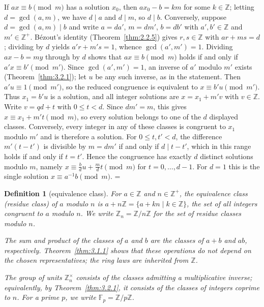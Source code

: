 \documentclass[11pt]{article}
\makeatletter
\theoremstyle{ntstyle}
\newtheorem{definition}{Definition}[subsection]
\let\nt@closedisplay\]
\def\nt@guardedclose{\@ifnextchar\par{\nt@closeafterpar}{\@ifnextchar\end{\postdisplaypenalty\@M\nt@closedisplay}{\nt@closedisplay}}}
\def\nt@closeafterpar\par{\@ifnextchar\par{\nt@closeafterpar}{\@ifnextchar\end{\postdisplaypenalty\@M\nt@closedisplay\par}{\nt@closedisplay\par}}}
\renewenvironment{proof}[1][\proofname]{\par
  \pushQED{\qed}\normalfont\topsep\medskipamount\edef\nt@afterproof{\@endparpenalty=\the\@endparpenalty\relax}\@beginparpenalty\@M\@endparpenalty\@M\let\]\nt@guardedclose\trivlist\item[]\textit{#1\@addpunct{.}} \ignorespaces}{\ifvmode\addpenalty\@M\fi\popQED\nt@afterproof\endtrivlist\@endpefalse}
\newcommand{\ZmodUnits}[1]{\mathbb{Z}_{#1}^{\times}}
\makeatother
\begin{document}
\begin{proof} If $ax \equiv b \pmod{m}$ has a solution
	$x_0$, then $ax_0 - b = km$ for some $k \in \mathbb{Z}$; letting $d =
		\gcd(a, m)$, we have $d \mid a$ and $d \mid m$, so $d \mid b$. Conversely,
	suppose $d = \gcd(a, m) \mid b$ and write $a = d a'$, $m = d m'$, $b =
		d b'$ with $a',b'\in\mathbb{Z}$ and $m'\in\mathbb{Z}^+$. B{\'e}zout's identity
		(Theorem~\ref{thm:2.2.5}) gives $r, s \in \mathbb{Z}$ with $a r + m s = d$;
	dividing by $d$ yields $a' r + m' s = 1$, whence $\gcd(a', m') = 1$.
	Dividing $ax - b = my$ through by $d$ shows that
	$ax \equiv b \pmod{m}$ holds if and only if $a' x \equiv b'
		\pmod{m'}$. Since $\gcd(a', m') = 1$, an inverse of $a'$ modulo $m'$ exists
	(Theorem~\ref{thm:3.2.1}); let $u$ be any such inverse, as in the statement. Then
	$a' u \equiv 1 \pmod{m'}$, so the reduced congruence is
	equivalent to $x \equiv b'u \pmod{m'}$. Thus $x_1=b'u$ is a solution,
	and all integer solutions are $x=x_1+m'v$ with $v\in\mathbb{Z}$.
	Write $v=qd+t$ with $0\le t<d$. Since $dm'=m$, this gives
	$x\equiv x_1+m't\pmod{m}$, so every solution belongs to one of the
	$d$ displayed classes. Conversely, every integer in any of these
	classes is congruent to $x_1$ modulo $m'$ and is therefore a solution.
	For $0\le t,t'<d$, the difference $m'(t-t')$ is divisible by
	$m=dm'$ if and only if $d\mid t-t'$, which in this range holds
	if and only if $t=t'$. Hence the congruence has exactly $d$ distinct
	solutions modulo $m$, namely
	$x\equiv\tfrac{b}{d}u+\tfrac{m}{d}t\pmod{m}$ for $t=0,\ldots,d-1$.
	For $d=1$ this is the single solution $x\equiv a^{-1}b\pmod{m}$.
\end{proof}
\begin{definition}[equivalence class]\label{def:3.2.2} For $a\in\mathbb{Z}$ and $n\in\mathbb{Z}^+$, the
	equivalence class (residue class) of $a$ modulo $n$ is
	$a+n\mathbb{Z}=\{a+kn\mid k\in\mathbb{Z}\}$, the set of all integers
	congruent to $a$ modulo $n$. We write $\mathbb{Z}_n=\mathbb{Z}/n\mathbb{Z}$
	for the set of residue classes modulo $n$.

	The sum and product of the classes of $a$ and $b$ are the classes of $a+b$ and $ab$, respectively.
	Theorem~\ref{thm:3.1.1} shows that these operations do not depend on the
	chosen representatives; the ring laws are inherited from $\mathbb{Z}$.

	The group of units $\ZmodUnits{n}$ consists of the classes admitting
	a multiplicative inverse; equivalently, by Theorem~\ref{thm:3.2.1},
	it consists of the classes of integers coprime to $n$. For a prime $p$, we write
	$\mathbb{F}_p=\mathbb{Z}/p\mathbb{Z}$.
\end{definition}
\end{document}
